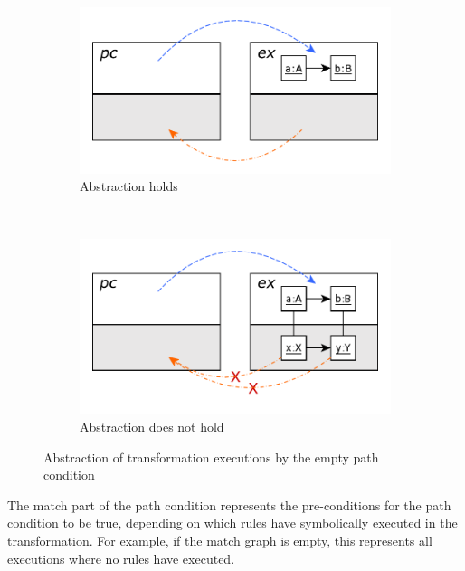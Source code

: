 \begin{figure}[htb]
        \centering
        \begin{subfigure}[b]{0.40\textwidth}
                \centering
                \includegraphics[width=1\textwidth]{./figures/abstraction_relation/empty_pc.pdf}
               	\caption{Abstraction holds}
               	\label{fig:empty_pc_success}
        \end{subfigure}%
        ~~\\
        \begin{subfigure}[b]{0.40\textwidth}
                \centering
                \includegraphics[width=1\textwidth]{./figures/abstraction_relation/empty_pc2.pdf}
                \caption{Abstraction does not hold}
                \label{fig:empty_pc_fail}
        \end{subfigure}%
        \caption{Abstraction of transformation executions by the empty path condition}
        \label{fig:empty_pc}
\end{figure}


The match part of the path condition represents the pre-conditions for the path condition to be true, depending on which rules have symbolically executed in the transformation. For example, if the match graph is empty, this represents all executions where no rules have executed. 

